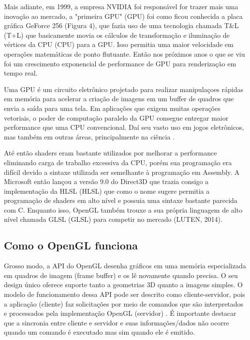 Mais adiante, em 1999, a empresa NVIDIA foi responsável for trazer mais uma inovação ao mercado, a "primeira GPU" (\acrlong{GPU}) foi como ficou conhecida a placa gráfica GeForce 256 (Figura 4), que fazia uso de uma tecnologia chamada T\&L (\acrlong{T+L}) que basicamente movia os cálculos de transformação e iluminação de vértices da CPU (\acrlong{CPU}) para a \acrshort{GPU}. Isso permitia uma maior velocidade em operações matemáticas de ponto flutuante. Então nos próximos anos o que se viu foi um crescimento exponencial de performance de \acrshort{GPU} para renderização em tempo real.

Uma GPU é um circuito eletrônico projetado para realizar manipulaçoes rápidas em memória para acelerar a criação de imagens em um buffer de quadros que envia a saída para uma tela. Em aplicações que exigem muitas operações vetoriais, o poder de computação paralelo da GPU consegue entregar maior performance que uma CPU convencional. Daí seu vasto uso em jogos eletrônicos, mas também em outras áreas, principalmente na ciência \cite{shea2013gpu}.

Até então shaders eram bastante utilizados por melhorar a performance eliminando carga de trabalho excessiva da \acrshort{CPU}, porém sua programação era difícil devido a sintaxe utilizada ser semelhante à programação em Assembly. A Microsoft então lançou a versão 9.0 do Direct3D que trazia consigo a implementação da HLSL (\acrlong{HLSL}) que como o nome sugere permitia a programação de shaders em alto nível e possuia uma sintaxe bastante parecida com C. Enquanto isso, OpenGL também trouxe a sua própria linguagem de alto nível chamada GLSL (\acrlong{GLSL}) para competir no mercado (LUTEN, 2014)\nocite{openGLBook}. 

\subsection{Como o OpenGL funciona}
\label{sec:como-opengl-funciona}

Grosso modo, a API do OpenGL desenha gráficos em uma memória especializada em quadros de imagem (frame buffer) e os lê novamente quando precisa. O seu design único oferece suporte tanto a geometrias 3D quanto a imagens simples. O modelo de funcionamento dessa API pode ser descrito como cliente-servidor, pois a aplicação (cliente) faz solicitações por meio de comandos que são interpretados e processados pela implementação OpenGL (servidor) \cite{GLSLBook}. É importante destacar que a sincronia entre cliente e servidor e suas informações/dados não ocorre quando um comando é executado mas sim quando ele é emitido.

